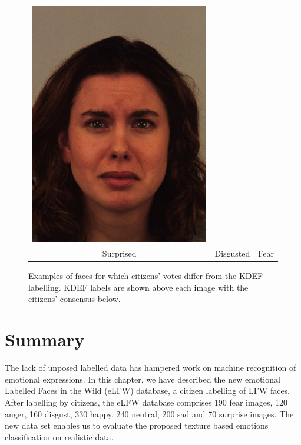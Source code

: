 \begin{figure}[H]
\begin{tabular}[t]{ccc}
   \includegraphics[scale=0.2]{Chapter4/Figs/MissedSad} \\
   Surprised  & Disgusted & Fear
  \end{tabular}
  \caption{Examples of faces for which citizens' votes differ from the KDEF labelling.  KDEF labels are shown above each image with the citizens' consensus below.}
  \label{fig:KDEF-vs-citizen}
\end{figure}



\section{Summary}
The lack of unposed labelled data has hampered work on machine recognition of emotional expressions.  In this chapter, we have described the new emotional Labelled Faces in the Wild (eLFW) database, a citizen labelling of LFW faces.  After labelling by citizens, the eLFW database comprises 190 fear images, 120 anger, 160 disgust, 330 happy, 240 neutral, 200 sad and 70 surprise images.
 The new data set enables us to evaluate the proposed texture based emotions classification on realistic data.  
\label{sec:ch3_Summary}





